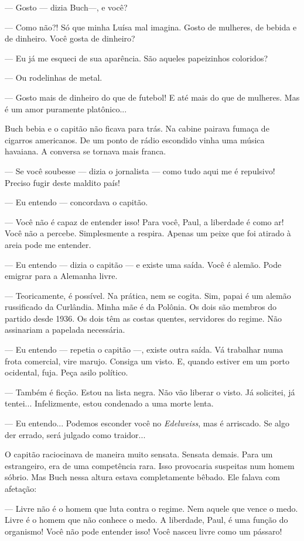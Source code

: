--- Gosto --- dizia Buch---, e você?

--- Como não?! Só que minha Luísa mal imagina. Gosto de mulheres, de
bebida e de dinheiro. Você gosta de dinheiro?

--- Eu já me esqueci de sua aparência. São aqueles papeizinhos
coloridos?

--- Ou rodelinhas de metal.

--- Gosto mais de dinheiro do que de futebol! E até mais do que de
mulheres. Mas é um amor puramente platônico...

Buch bebia e o capitão não ficava para trás. Na cabine pairava fumaça de
cigarros americanos. De um ponto de rádio escondido vinha uma música
havaiana. A conversa se tornava mais franca.

--- Se você soubesse --- dizia o jornalista --- como tudo aqui me é
repulsivo! Preciso fugir deste maldito país!

--- Eu entendo --- concordava o capitão.

--- Você não é capaz de entender isso! Para você, Paul, a liberdade é
como ar! Você não a percebe. Simplesmente a respira. Apenas um peixe que
foi atirado à areia pode me entender.

--- Eu entendo --- dizia o capitão --- e existe uma saída. Você é
alemão. Pode emigrar para a Alemanha livre.

--- Teoricamente, é possível. Na prática, nem se cogita. Sim, papai é um
alemão russificado da Curlândia. Minha mãe é da Polônia. Os dois são
membros do partido desde 1936. Os dois têm as costas quentes, servidores
do regime. Não assinariam a papelada necessária.

--- Eu entendo --- repetia o capitão ---, existe outra saída. Vá
trabalhar numa frota comercial, vire marujo. Consiga um visto. E, quando
estiver em um porto ocidental, fuja. Peça asilo político.

--- Também é ficção. Estou na lista negra. Não vão liberar o visto. Já
solicitei, já tentei... Infelizmente, estou condenado a uma morte lenta.

--- Eu entendo... Podemos esconder você no \emph{Edelweiss}, mas é
arriscado. Se algo der errado, será julgado como traidor...

O capitão raciocinava de maneira muito sensata. Sensata demais. Para um
estrangeiro, era de uma competência rara. Isso provocaria suspeitas num
homem sóbrio. Mas Buch nessa altura estava completamente bêbado. Ele
falava com afetação:

--- Livre não é o homem que luta contra o regime. Nem aquele que vence o
medo. Livre é o homem que não conhece o medo. A liberdade, Paul, é uma
função do organismo! Você não pode entender isso! Você nasceu livre como
um pássaro!

